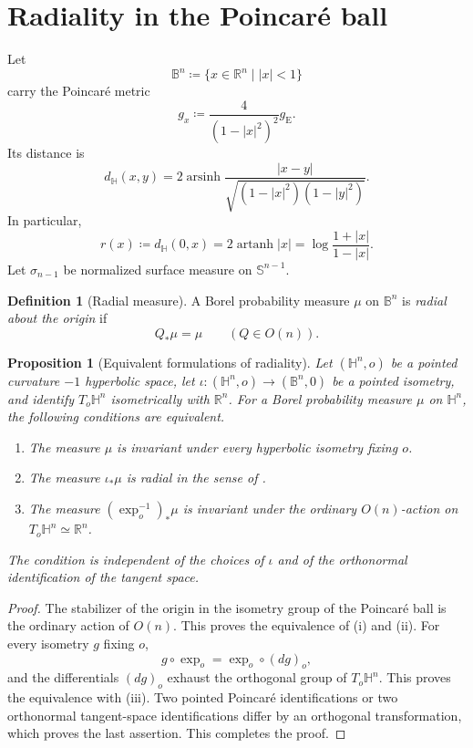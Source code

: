 \documentclass{amsart}
\numberwithin{equation}{section}
\theoremstyle{plain}
\newtheorem{prop}[thm]{Proposition}
\theoremstyle{definition}
\newtheorem{defn}[thm]{Definition}
\theoremstyle{remark}
\newcommand{\R}{\mathbb{R}}
\newcommand{\B}{\mathbb{B}}
\newcommand{\Hyp}{\mathbb{H}}
\newcommand{\Sph}{\mathbb{S}}
\DeclareMathOperator{\arsinh}{arsinh}
\DeclareMathOperator{\artanh}{artanh}
\begin{document}
\section{Radiality in the Poincar\'e ball}\label{sec:radiality}

Let
\[ \B^n\coloneqq\{x\in\R^n\mid |x|<1\} \]
carry the Poincar\'e metric
\[ g_x\coloneqq\frac4{(1-|x|^2)^2}g_{\mathrm E}. \]
Its distance is
\begin{equation}\label{eq:poincare-distance}
	d_{\Hyp}(x,y)
	=
	2\arsinh\frac{|x-y|}
	{\sqrt{(1-|x|^2)(1-|y|^2)}}.
\end{equation}
In particular,
\begin{equation}\label{eq:origin-radius}
	r(x)\coloneqq d_{\Hyp}(0,x)
	=2\artanh|x|
	=\log\frac{1+|x|}{1-|x|}.
\end{equation}
Let $\sigma_{n-1}$ be normalized surface measure on $\Sph^{n-1}$.

\begin{defn}[Radial measure]\label{def:radial}
	A Borel probability measure $\mu$ on $\B^n$ is \emph{radial about the
	origin} if
\[ Q_*\mu=\mu \qquad(Q\in O(n)). \]
\end{defn}

\begin{prop}[Equivalent formulations of radiality]
\label{prop:equivalent-radiality}
	Let $(\Hyp^n,o)$ be a pointed curvature $-1$ hyperbolic space, let
	$\iota\colon(\Hyp^n,o)\to(\B^n,0)$ be a pointed isometry, and identify
	$T_o\Hyp^n$ isometrically with $\R^n$.  For a Borel probability measure
	$\mu$ on $\Hyp^n$, the following conditions are equivalent.
	\begin{enumerate}[label=\textup{(\roman*)}]
	\item The measure $\mu$ is invariant under every hyperbolic isometry
	fixing $o$.
	\item The measure $\iota_*\mu$ is radial in the sense of
	.
	\item The measure $(\exp_o^{-1})_*\mu$ is invariant under the ordinary
	$O(n)$-action on $T_o\Hyp^n\simeq\R^n$.
	\end{enumerate}
	The condition is independent of the choices of $\iota$ and of the
	orthonormal identification of the tangent space.
\end{prop}

\begin{proof}
	The stabilizer of the origin in the isometry group of the Poincar\'e ball
	is the ordinary action of $O(n)$.  This proves the equivalence of
	\textup{(i)} and \textup{(ii)}.  For every isometry $g$ fixing $o$,
	\[
		g\circ\exp_o=\exp_o\circ(dg)_o,
	\]
	and the differentials $(dg)_o$ exhaust the orthogonal group of
	$T_o\Hyp^n$.  This proves the equivalence with \textup{(iii)}.  Two
	pointed Poincar\'e identifications or two orthonormal tangent-space
	identifications differ by an orthogonal transformation, which proves the
	last assertion.  This completes the proof.
\end{proof}
\end{document}
